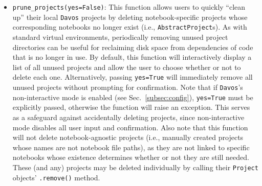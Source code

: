 \documentclass[preprint,12pt,a4paper]{elsarticle}
\begin{document}
\begin{itemize}
\item \texttt{prune\_projects(yes=False)}: This function allows users to quickly ``clean up'' their local \texttt{Davos} projects by deleting notebook-specific projects whose corresponding notebooks no longer exist (i.e., \texttt{AbstractProject}s).
  As with standard virtual environments, periodically removing unused project directories can be useful for reclaiming disk space from dependencies of code that is no longer in use.
  By default, this function will interactively display a list of all unused projects and allow the user to choose whether or not to delete each one.
  Alternatively, passing \texttt{yes=True} will immediately remove all unused projects without prompting for confirmation.
  Note that if \texttt{Davos}'s non-interactive mode is enabled (see Sec.~\ref{subsec:config}), \texttt{yes=True} must be explicitly passed, otherwise the function will raise an exception.
  This serves as a safeguard against accidentally deleting projects, since non-interactive mode disables all user input and confirmation.
  Also note that this function will not delete notebook-agnostic projects (i.e., manually created projects whose names are not notebook file paths), as they are not linked to specific notebooks whose existence determines whether or not they are still needed.
  These (and any) projects may be deleted individually by calling their \texttt{Project} objects' \texttt{.remove()} method.


\end{itemize}
\end{document}

